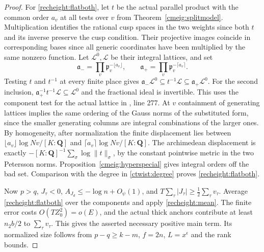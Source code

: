 \begin{proof}
For \eqref{recheight:flatboth}, let \(t\) be the actual parallel
product with the common order \(a_v\) at all tests over \(v\) from
Theorem~\ref{cmeig:splitmodel}. Multiplication
identifies the rational cusp spaces in the two weights since
both \(t\) and its inverse preserve the cusp condition. Their
projective images coincide in corresponding bases since all generic
coordinates have been multiplied by the same nonzero function.
Let \(\mathcal L^0,\mathcal L\) be their integral lattices, and set
\[
 \mathfrak a_-=\prod_v\mathfrak p_v^{-\lfloor a_v\rfloor},
 \qquad
 \mathfrak a_+=\prod_v\mathfrak p_v^{-\lceil a_v\rceil}.
\]
Testing \(t\) and \(t^{-1}\) at every finite place gives
\(\mathfrak a_-\mathcal L^0\subseteq t^{-1}\mathcal L
\subseteq\mathfrak a_+\mathcal L^0\). For the second inclusion,
\(\mathfrak a_+^{-1}t^{-1}\mathcal L\subseteq\mathcal L^0\)
and the fractional ideal is invertible. This uses the component
test for the actual lattice in ,
line 277. At \(v\) containment of generating lattices implies the
same ordering of the Gauss norms of the substituted form, since
the smaller generating columns are integral combinations of the
larger ones. By homogeneity, after normalization the finite
displacement lies between \(\lfloor a_v\rfloor\log N v/[K:\mathbf Q]\)
and \(\lceil a_v\rceil\log N v/[K:\mathbf Q]\).
The archimedean displacement is exactly
\(-[K:\mathbf Q]^{-1}\sum_\sigma\log\|t\|_\sigma\), by the constant
pointwise metric in the two Petersson norms. Proposition~\ref{cmeig:hyperspecial}
gives integral orders off the bad set. Comparison with the degree in \eqref{ctwist:degree}
proves \eqref{recheight:flatboth}.

Now \(p>q\), \(J_\tau<0\), \(A_{J_d}\le-\log n+O_\psi(1)\),
and \(T\sum_\tau |J_\tau|\ge\frac12\sum_\tau v_\tau\).
Average \eqref{recheight:flatboth} over the components and apply
\eqref{recheight:mean}. The finite error costs
\(O(TZ_0^2)=o(E)\), and the actual thick anchors contribute at
least \(n_2b/2\) to \(\sum_\tau v_\tau\). This gives the asserted
necessary positive main term. Its normalized size follows from
\(p-q\ge k-m\), \(f=2n\), \(L=x^\epsilon\) and the rank bounds.
\end{proof}

